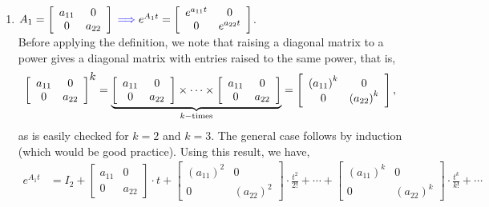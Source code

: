  \begin{enumerate}
\renewcommand{\labelenumi}{(\alph{enumi})}
\setlength{\itemsep}{.8cm}
     \item $A_1 = \left[ \begin{array}{cc} a_{11} & 0\\0 & a_{22}\end{array}\right] {\color{blue}\implies} e^{A_1  t} = \left[ \begin{array}{cc} e^{a_{11}t} & 0\\0 & e^{a_{22}t} \end{array}\right] $.\\

     Before applying the definition, we note that raising a diagonal matrix to a power gives a diagonal matrix with entries raised to the same power, that is, 
     $$ \left[ \begin{array}{cc} a_{11} & 0\\0 & a_{22}\end{array}\right]^{\scalebox{1.0}{$k$}} = \underbrace{ \left[ \begin{array}{cc} a_{11} & 0\\0 & a_{22}\end{array}\right] \times \cdots \times \left[ \begin{array}{cc} a_{11} & 0\\0 & a_{22}\end{array}\right]  }_{k-\text{times}} = \left[ \begin{array}{cc} \left(a_{11}\right)^k & 0\\0 & \left(a_{22}\right)^k\end{array}\right], $$
     as is easily checked for $k=2$ and $k=3$. The general case follows by induction (which would be good practice). Using this result, we have,
 \begin{align*}
 e^{A_1  t} &= I_2 + \left[\begin{array}{cc} a_{11} & 0 \\ 0 & a_{22} \end{array} \right]  \cdot t +  \left[ \begin{array}{cc} \left(a_{11}\right)^2 & 0\\0 & \left(a_{22}\right)^2\end{array}\right] \cdot \frac{t^2}{2!} + \cdots + \left[ \begin{array}{cc} \left(a_{11}\right)^k & 0\\0 & \left(a_{22}\right)^k\end{array}\right]  \cdot \frac{t^k}{k!} + \cdots \\[1em]

\end{align*}
\end{enumerate}
